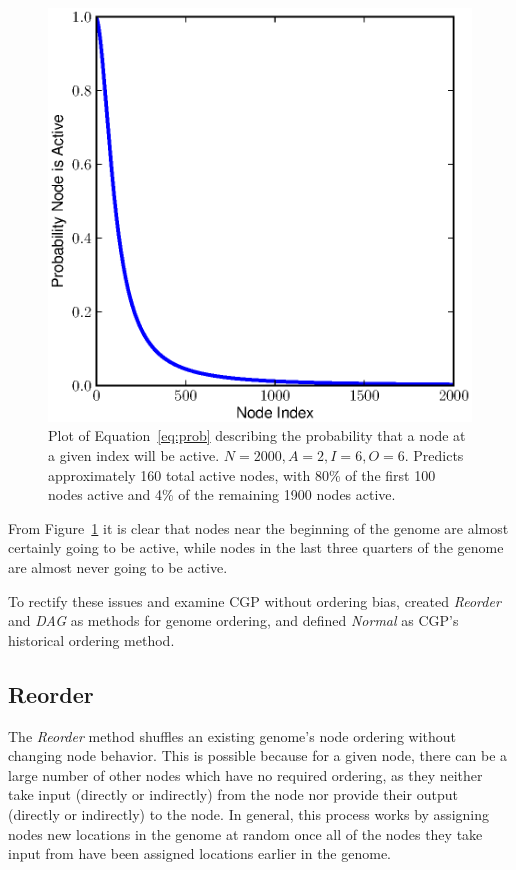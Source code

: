 \documentclass[journal]{IEEEtran}
\begin{document}
\begin{figure}
\includegraphics[width=\columnwidth,height=\textheight,keepaspectratio]{active_prob}
\caption{Plot of Equation~\ref{eq:prob} describing the probability that a node
         at a given index will be active.  $N=2000, A=2, I=6, O=6$.
         Predicts approximately 160 total active nodes, with 80\% of the first
         100 nodes active and 4\% of the remaining 1900 nodes active.}
\label{fig:prob}
\end{figure}

From Figure~\ref{fig:prob} it is clear that nodes near the beginning of the genome
are almost certainly going to be active, while nodes in the last three quarters
of the genome are almost never going to be active.

To rectify these issues and examine CGP without ordering bias, \cite{goldman:2013:ordering}
created \emph{Reorder} and \emph{DAG} as methods for genome ordering, and defined
\emph{Normal} as CGP's historical ordering method.

\subsection{Reorder}
\label{sec:reorder}
The \emph{Reorder} method shuffles an existing genome's node ordering without
changing node behavior.  This is possible because for a given node, there can
be a large number of other nodes which have no required ordering,
as they neither take input (directly or indirectly) from the node nor provide their
output (directly or indirectly) to the node.  In general, this process works by assigning nodes new
locations in the genome at random once all of the nodes they take input from have been assigned
locations earlier in the genome.
\end{document}
